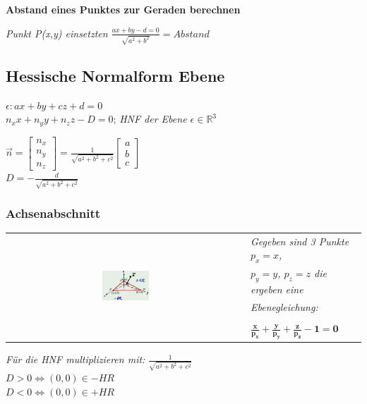 \textbf{Abstand eines Punktes zur Geraden berechnen}

\textit{Punkt P(x,y) einsetzten $\frac{a x + b y - d = 0}{\sqrt{a^2 + b^2}} = Abstand$}

\subsection{Hessische Normalform Ebene}

$\epsilon: ax + by + cz + d = 0$ \\

$n_x x + n_y y + n_z z - D = 0$;
\textit{HNF der Ebene $\epsilon \in \mathbb{R}^3$}

$\vec{n} = \begin{bmatrix}
    n_x \\
    n_y \\
    n_z
\end{bmatrix} = \frac{1}{\sqrt{a^2 + b^2 + c^2}} \begin{bmatrix}
    a \\
    b \\
    c
\end{bmatrix} $ \\
$D = - \frac{d}{\sqrt{a^2 + b^2 + c^2}}$

\subsubsection{Achsenabschnitt}

\begin{tabular}{cl}
    \multirow{5}{*}{
        \includegraphics[width=0.2\textwidth]{assets/hnfachsenabschnitt.png}
    }
    & \textit{Gegeben sind 3 Punkte $p_x = x$, } \\
    & \textit{$p_y = y$, $p_z = z$ die ergeben eine } \\
    & \textit{Ebenegleichung:} \\
    & \\
    & $\mathbf{\frac{x}{p_x} + \frac{y}{p_y} + \frac{z}{p_z} - 1 = 0}$ \\
\end{tabular}
\textit{Für die HNF multiplizieren mit:} 
$\frac{1}{\sqrt{a^2 + b^2 + c^2}}$\\

$D > 0 \Leftrightarrow (0,0) \in -HR $ \\
$D < 0 \Leftrightarrow (0,0) \in +HR $ \\


